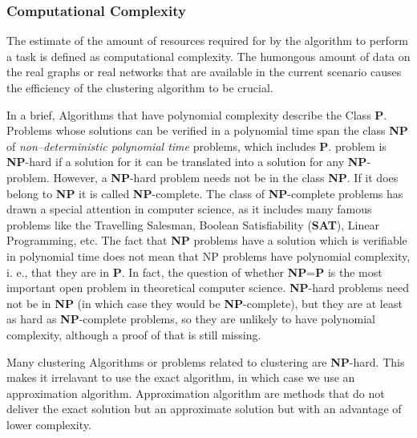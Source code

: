 \subsubsection{Computational Complexity}
 The estimate of the amount of resources required for by the algorithm to perform a task is defined as computational complexity. The humongous amount of data on the real graphs or real networks that are available in the current scenario causes the efficiency of the clustering algorithm to be crucial.
\par In a brief, Algorithms that have polynomial complexity describe the Class \textbf{P}. Problems whose solutions can be verified in a polynomial time span the class \textbf{NP} of \textit{non--deterministic polynomial time} problems, which includes \textbf{P}. problem is \textbf{NP}-hard if a solution for it can be
translated into a solution for any \textbf{NP}-problem. However,
a \textbf{NP}-hard problem needs not be in the class \textbf{NP}. If it
does belong to \textbf{NP} it is called \textbf{NP}-complete. The class
of \textbf{NP}-complete problems has drawn a special attention
in computer science, as it includes many famous problems like the Travelling Salesman, Boolean Satisfiability
(\textbf{SAT}), Linear Programming, etc.
The fact that \textbf{NP} problems have a solution which is verifiable in polynomial
time does not mean that NP problems have polynomial
complexity, i. e., that they are in \textbf{P}. In fact, the question of whether \textbf{NP}=\textbf{P} is the most important open problem in theoretical computer science. \textbf{NP}-hard problems
need not be in \textbf{NP} (in which case they would be \textbf{NP}-complete), but they are at least as hard as \textbf{NP}-complete
problems, so they are unlikely to have polynomial complexity, although a proof of that is still missing.
\par Many clustering Algorithms or problems related to clustering are \textbf{NP}-hard. This makes it irrelavant to use the exact algorithm, in which case we use an approximation algorithm. Approximation algorithm are methods that do not deliver the exact solution but an approximate solution but with an advantage of lower complexity. \cite{communitypaper}


